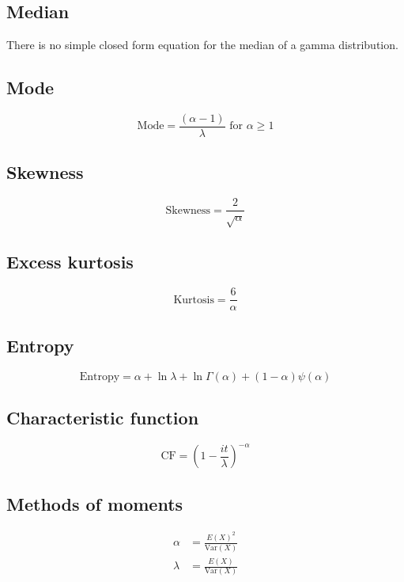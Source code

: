 \documentclass[12pt]{article}
\begin{document}
\subsection{Median}
\noindent There is no simple closed form equation for the median of a gamma distribution.

\subsection{Mode}
\begin{equation*}\label{eq:gamma-mode-2}
	\text{Mode} = \frac{(\alpha-1)}{\lambda}\text{ for }\alpha \geq 1
\end{equation*}

\subsection{Skewness}
\begin{equation*}\label{eq:gamma-skewness-2}
	\text{Skewness} = \frac{2}{\sqrt{\alpha}}
\end{equation*}

\subsection{Excess kurtosis}
\begin{equation*}\label{eq:gamma-kurtosis-2}
	\text{Kurtosis} = \frac{6}{\alpha}
\end{equation*}

\subsection{Entropy}
\begin{equation*}\label{eq:gamma-entropy-2}
	\text{Entropy} = \alpha + \ln{\lambda} + \ln{\Gamma(\alpha)} + (1-\alpha)\psi(\alpha)
\end{equation*}

\subsection{Characteristic function}
\begin{equation*}\label{eq:gamma-cf-2}
	\text{CF} = \left(1-\frac{it}{\lambda}\right)^{-\alpha}
\end{equation*}

\subsection{Methods of moments}
\begin{equation*}\label{eq:gamma-mom-2}
	\begin{split}
		\alpha	&=	\frac{E(X)^2}{\text{Var}(X)}\\
		\lambda	&=	\frac{E(X)}{\text{Var}(X)}
	\end{split}
\end{equation*}
\end{document}
